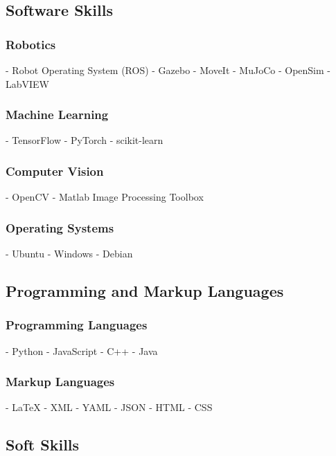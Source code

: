 \documentclass[a4paper]{article}
\begin{document}
\newpage
\subsection{Software Skills}
        
\subsubsection{Robotics}
- Robot Operating System (ROS)
- Gazebo
- MoveIt
- MuJoCo
- OpenSim
- LabVIEW
    
\subsubsection{Machine Learning}
- TensorFlow
- PyTorch
- scikit-learn
    
\subsubsection{Computer Vision}
- OpenCV
- Matlab Image Processing Toolbox
    
\subsubsection{Operating Systems}
- Ubuntu
- Windows
- Debian
    
    
\subsection{Programming and Markup Languages}
        
\subsubsection{Programming Languages}
- Python
- JavaScript
- C++
- Java
    
\subsubsection{Markup Languages}
- {\LaTeX}
- XML
- YAML
- JSON
- HTML
- CSS
    
\subsection{Soft Skills}
        
\end{document}
